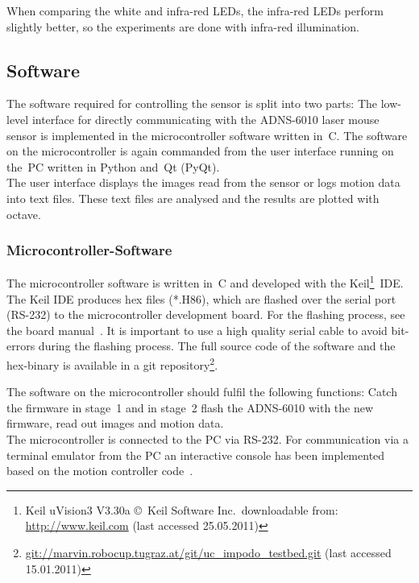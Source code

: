\documentclass[12pt,a4paper]{article}
\begin{document}
When comparing the white and infra-red LEDs, the infra-red LEDs perform slightly better, so the experiments are done with infra-red illumination.


\subsection{Software}
\label{software}

The software required for controlling the sensor is split into two parts: 
The low-level interface for directly communicating with the ADNS-6010 laser mouse sensor is implemented in the microcontroller software written in~C.
The software on the microcontroller is again commanded from the user interface running on the~PC written in Python and~Qt (PyQt).\\
The user interface displays the images read from the sensor or logs motion data into text files.
These text files are analysed and the results are plotted with octave.

\subsubsection{Microcontroller-Software}

The microcontroller software is written in~C and developed with the Keil\footnote{Keil uVision3 V3.30a \copyright~Keil Software Inc.\ downloadable from: \url{http://www.keil.com} (last accessed 25.05.2011)}~IDE. 
The Keil IDE produces hex files (*.H86), which are flashed over the serial port (RS-232) to the microcontroller development board.
For the flashing process, see the board manual~\cite{xc}.
It is important to use a high quality serial cable to avoid bit-errors during the flashing process.
The full source code of the software and the hex-binary is available in a git repository\footnote{\url{git://marvin.robocup.tugraz.at/git/uc_impodo_testbed.git} (last accessed 15.01.2011)}.

The  software on the microcontroller should fulfil the following functions:
Catch the firmware in stage~1
and in stage~2 flash the ADNS-6010 with the new firmware, 
read out images and motion data.\\
The microcontroller is connected to the PC via RS-232.
For communication via a terminal emulator from the PC an interactive console has been implemented based on the motion controller code~\cite{krammer07}.
\end{document}
